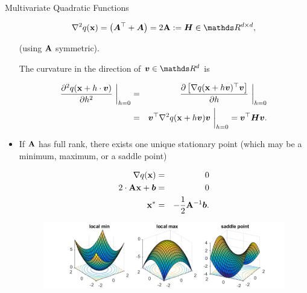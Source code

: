 \documentclass[11pt,compress,t,notes=noshow, xcolor=table]{beamer}
\begin{document}
\begin{vbframe}{Multivariate Quadratic Functions}
\begin{itemize}
    \begin{eqnarray*}
      \nabla^2 q(\xv) = \left(\bm{A}^\top + \bm{A}\right) = 2 \Amat := \bm{H} \in \R^{d \times d},
    \end{eqnarray*}
  
    (using $\mathbf{A}$ symmetric). 
  
    \vspace*{0.2cm}
  
    The curvature in the direction of $\bm{v}\in \R^d$ is 
  
    \begin{eqnarray*}
      \frac{\partial^2 q(\mathbf{x} + h \cdot \bm{v})}{\partial h^2}~\bigg\rvert_{h = 0} &=& \frac{\partial \left[\nabla q(\mathbf{x} + h \bm{v})^\top\bm{v}\right]}{\partial h}~\bigg\rvert_{h = 0} \\ &=& \bm{v}^\top \nabla^2 q(\mathbf{x} + h \bm{v}) \bm{v}~\bigg\rvert_{h = 0} = \bm{v}^\top \bm{H} \bm{v}.
    \end{eqnarray*}
  
  
    \item If $\mathbf{A}$ has full rank, there exists one unique stationary point (which may be a minimum, maximum, or a saddle point) 
  
    \begin{eqnarray*}
      \nabla q(\mathbf{x}) &=& 0 \\
      2 \cdot \mathbf{A} \mathbf{x} + \bm{b} &=& 0 \\
      \mathbf{x}^\ast &=& - \frac{1}{2} \mathbf{A}^{-1} \bm{b}.
    \end{eqnarray*}  
  
  
  \begin{figure}
    \includegraphics{figure_man/minmaxsaddle.png}\\
    \begin{footnotesize} 
    \end{footnotesize}
  \end{figure}
  
  
  \end{itemize}
  
  
  
  
  
  
  
  \end{vbframe}



  \endlecture
\end{document}
